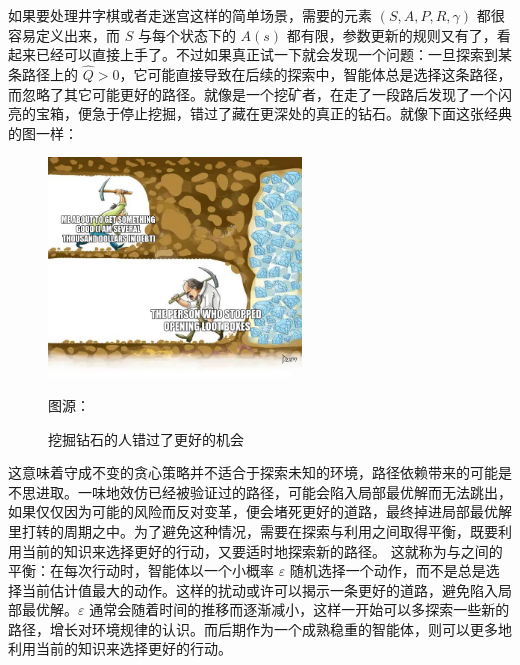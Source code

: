 如果要处理井字棋或者走迷宫这样的简单场景，需要的元素 $(S, A, P, R, \gamma)$ 都很容易定义出来，而 $S$ 与每个状态下的 $A(s)$ 都有限，参数更新的规则又有了，看起来已经可以直接上手了。不过如果真正试一下就会发现一个问题：一旦探索到某条路径上的 $\hat Q > 0$，它可能直接导致在后续的探索中，智能体总是选择这条路径，而忽略了其它可能更好的路径。就像是一个挖矿者，在走了一段路后发现了一个闪亮的宝箱，便急于停止挖掘，错过了藏在更深处的真正的钻石。就像下面这张经典的图一样：
\begin{figure}[H]
\centering
\includegraphics[width=0.6\textwidth]{img/digging_for_diamonds.png}
\caption{挖掘钻石的人错过了更好的机会}
{图源：}
\end{figure}

这意味着守成不变的贪心策略并不适合于探索未知的环境，路径依赖带来的可能是不思进取。一味地效仿已经被验证过的路径，可能会陷入局部最优解而无法跳出，如果仅仅因为可能的风险而反对变革，便会堵死更好的道路，最终掉进局部最优解里打转的周期之中。为了避免这种情况，需要在探索与利用之间取得平衡，既要利用当前的知识来选择更好的行动，又要适时地探索新的路径。
这就称为与之间的平衡：在每次行动时，智能体以一个小概率 $\varepsilon$ 随机选择一个动作，而不是总是选择当前估计值最大的动作。这样的扰动或许可以揭示一条更好的道路，避免陷入局部最优解。$\varepsilon$ 通常会随着时间的推移而逐渐减小，这样一开始可以多探索一些新的路径，增长对环境规律的认识。而后期作为一个成熟稳重的智能体，则可以更多地利用当前的知识来选择更好的行动。

